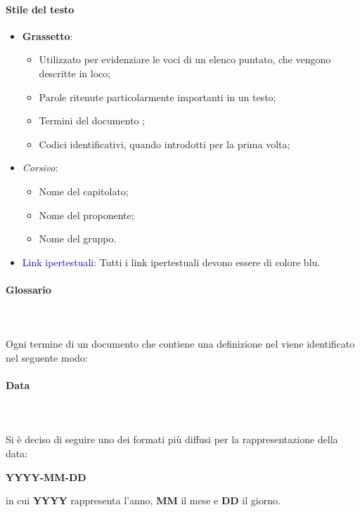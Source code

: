 \paragraph{Stile del testo}\mbox{}
\begin{itemize}
    \item \textbf{Grassetto}:
    \begin{itemize}
        \item Utilizzato per evidenziare le voci di un elenco puntato, che vengono descritte in loco;
        \item Parole ritenute particolarmente importanti in un testo;
        \item Termini del documento \Glossario{};
        \item Codici identificativi, quando introdotti per la prima volta;
    \end{itemize}
    \item \textit{Corsivo}:
    \begin{itemize}
        \item Nome del capitolato;
        \item Nome del proponente;
        \item Nome del gruppo.
    \end{itemize}
    \item \textcolor{blue}{Link ipertestuali}: Tutti i link ipertestuali devono essere di colore blu.
\end{itemize}

\paragraph{Glossario}\mbox{} \\ \\
Ogni termine di un documento che contiene una definizione nel \Glossario  viene identificato nel seguente modo:
\begin{center}
\end{center}

\paragraph{Data}\mbox{} \\ \\
Si è deciso di seguire uno dei formati più diffusi per la rappresentazione della data:
\begin{center}
\textbf{YYYY-MM-DD}
\end{center}
in cui \textbf{YYYY} rappresenta l'anno, \textbf{MM} il mese e \textbf{DD} il giorno.

